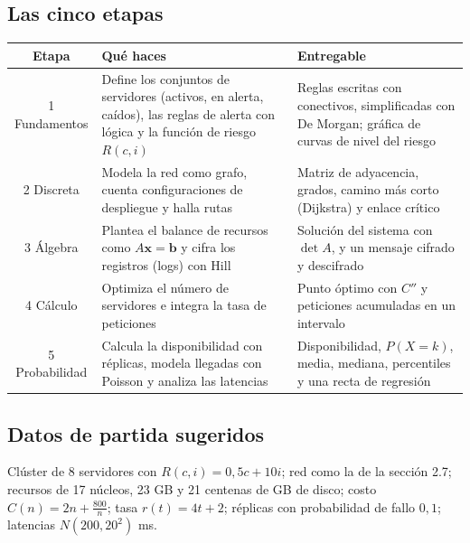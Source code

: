 \subsection{Las cinco etapas}
\begin{center}
\begin{tabular}{|c|p{4.4cm}|p{7.2cm}|}
\hline
\rowcolor{tmAzulClaro}\textbf{Etapa} & \textbf{Qu\'e haces} & \textbf{Entregable}\\ \hline
1 Fundamentos & Define los conjuntos de servidores (activos, en alerta, ca\'idos), las reglas de alerta con l\'ogica y la funci\'on de riesgo $R(c, i)$ & Reglas escritas con conectivos, simplificadas con De Morgan; gr\'afica de curvas de nivel del riesgo\\ \hline
2 Discreta & Modela la red como grafo, cuenta configuraciones de despliegue y halla rutas & Matriz de adyacencia, grados, camino m\'as corto (Dijkstra) y enlace cr\'itico\\ \hline
3 \'Algebra & Plantea el balance de recursos como $A\mathbf x=\mathbf b$ y cifra los registros (logs) con Hill & Soluci\'on del sistema con $\det A$, y un mensaje cifrado y descifrado\\ \hline
4 C\'alculo & Optimiza el n\'umero de servidores e integra la tasa de peticiones & Punto \'optimo con $C''$ y peticiones acumuladas en un intervalo\\ \hline
5 Probabilidad & Calcula la disponibilidad con r\'eplicas, modela llegadas con Poisson y analiza las latencias & Disponibilidad, $P(X=k)$, media, mediana, percentiles y una recta de regresi\'on\\ \hline
\end{tabular}
\end{center}

\subsection{Datos de partida sugeridos}
\begin{tmsistemas}
Cl\'uster de 8 servidores con $R(c, i)=0{,}5c+10i$; red como la de la secci\'on 2.7; recursos de 17 n\'ucleos, 23 GB y 21 centenas de GB de disco; costo $C(n)=2n+\frac{800}{n}$; tasa $r(t)=4t+2$; r\'eplicas con probabilidad de fallo $0{,}1$; latencias $N(200, 20^2)$ ms.
\end{tmsistemas}


